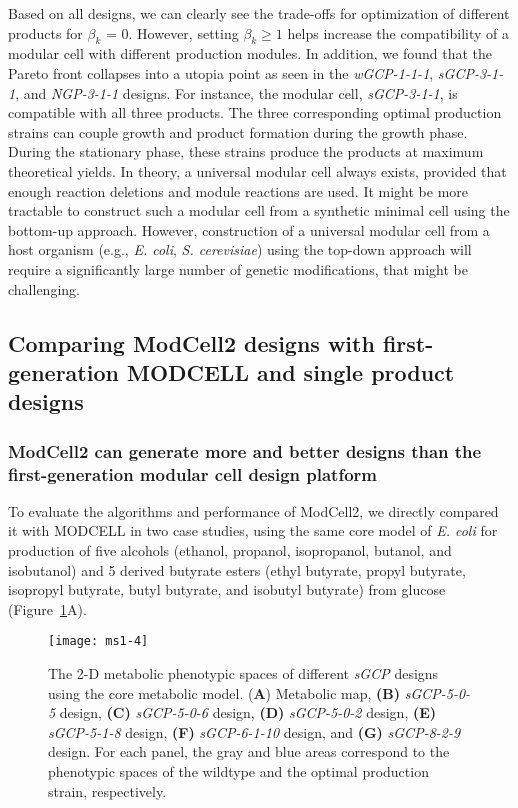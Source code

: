 Based on all designs, we can clearly see the trade-offs for optimization of different products for \(\beta_{k}\) = 0.
However, setting \(\beta_{k} \geq 1\) helps increase the compatibility of a modular cell with different production modules.
In addition, we found that the Pareto front collapses into a utopia point as seen in the \emph{wGCP-1-1-1}, \emph{sGCP-3-1-1}, and \emph{NGP-3-1-1} designs.
For instance, the modular cell, \emph{sGCP-3-1-1}, is compatible with all three products.
The three corresponding optimal production strains can couple growth and product formation during the growth phase.
During the stationary phase, these strains produce the products at maximum theoretical yields.
In theory, a universal modular cell always exists, provided that enough reaction deletions and module reactions are used.
It might be more tractable to construct such a modular cell from a synthetic minimal cell using the bottom-up approach.
However, construction of a universal modular cell from a host organism (e.g., \emph{E.
coli}, \emph{S. cerevisiae}) using the top-down approach will require a significantly large number of genetic modifications, that might be challenging.


\subsection{Comparing ModCell2 designs with first-generation MODCELL and single product designs}

\subsubsection{ModCell2 can generate more and better designs than the
first-generation modular cell design platform}
To evaluate the algorithms and performance of ModCell2, we directly compared it with
MODCELL \citep{trinh2015} in two case studies, using the same
core model of \emph{E. coli} for production of five alcohols (ethanol,
propanol, isopropanol, butanol, and isobutanol) and 5 derived butyrate
esters (ethyl butyrate, propyl butyrate, isopropyl butyrate, butyl
butyrate, and isobutyl butyrate) from glucose (Figure~\ref{fig:ms1-fig4}A).

\begin{figure}[p]
  \centering
  \texttt{[image: ms1-4]}
    \caption[2-D metabolic phenotypic spaces of different \emph{sGCP} designs using the core metabolic model]{
The 2-D metabolic phenotypic spaces of different
\emph{sGCP} designs using the core metabolic model. (\textbf{A})
Metabolic map, \textbf{(B)} \emph{sGCP-5-0-5} design, \textbf{(C)}
\emph{sGCP-5-0-6} design, \textbf{(D)} \emph{sGCP-5-0-2} design,
\textbf{(E)} \emph{sGCP-5-1-8} design, \textbf{(F)} \emph{sGCP-6-1-10}
design, and \textbf{(G)} \emph{sGCP-8-2-9} design. For each panel, the
gray and blue areas correspond to the phenotypic spaces of the wildtype
and the optimal production strain, respectively.
    }
    \label{fig:ms1-fig4}
\end{figure}

